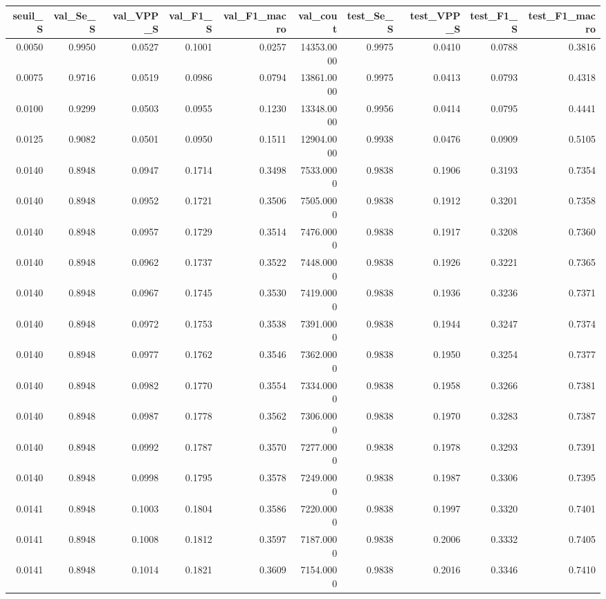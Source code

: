 \begin{tabular}{rrrrrrrrrr}
\toprule
seuil_S & val_Se_S & val_VPP_S & val_F1_S & val_F1_macro & val_cout & test_Se_S & test_VPP_S & test_F1_S & test_F1_macro \\
\midrule
0.0050 & 0.9950 & 0.0527 & 0.1001 & 0.0257 & 14353.0000 & 0.9975 & 0.0410 & 0.0788 & 0.3816 \\
0.0075 & 0.9716 & 0.0519 & 0.0986 & 0.0794 & 13861.0000 & 0.9975 & 0.0413 & 0.0793 & 0.4318 \\
0.0100 & 0.9299 & 0.0503 & 0.0955 & 0.1230 & 13348.0000 & 0.9956 & 0.0414 & 0.0795 & 0.4441 \\
0.0125 & 0.9082 & 0.0501 & 0.0950 & 0.1511 & 12904.0000 & 0.9938 & 0.0476 & 0.0909 & 0.5105 \\
0.0140 & 0.8948 & 0.0947 & 0.1714 & 0.3498 & 7533.0000 & 0.9838 & 0.1906 & 0.3193 & 0.7354 \\
0.0140 & 0.8948 & 0.0952 & 0.1721 & 0.3506 & 7505.0000 & 0.9838 & 0.1912 & 0.3201 & 0.7358 \\
0.0140 & 0.8948 & 0.0957 & 0.1729 & 0.3514 & 7476.0000 & 0.9838 & 0.1917 & 0.3208 & 0.7360 \\
0.0140 & 0.8948 & 0.0962 & 0.1737 & 0.3522 & 7448.0000 & 0.9838 & 0.1926 & 0.3221 & 0.7365 \\
0.0140 & 0.8948 & 0.0967 & 0.1745 & 0.3530 & 7419.0000 & 0.9838 & 0.1936 & 0.3236 & 0.7371 \\
0.0140 & 0.8948 & 0.0972 & 0.1753 & 0.3538 & 7391.0000 & 0.9838 & 0.1944 & 0.3247 & 0.7374 \\
0.0140 & 0.8948 & 0.0977 & 0.1762 & 0.3546 & 7362.0000 & 0.9838 & 0.1950 & 0.3254 & 0.7377 \\
0.0140 & 0.8948 & 0.0982 & 0.1770 & 0.3554 & 7334.0000 & 0.9838 & 0.1958 & 0.3266 & 0.7381 \\
0.0140 & 0.8948 & 0.0987 & 0.1778 & 0.3562 & 7306.0000 & 0.9838 & 0.1970 & 0.3283 & 0.7387 \\
0.0140 & 0.8948 & 0.0992 & 0.1787 & 0.3570 & 7277.0000 & 0.9838 & 0.1978 & 0.3293 & 0.7391 \\
0.0140 & 0.8948 & 0.0998 & 0.1795 & 0.3578 & 7249.0000 & 0.9838 & 0.1987 & 0.3306 & 0.7395 \\
0.0141 & 0.8948 & 0.1003 & 0.1804 & 0.3586 & 7220.0000 & 0.9838 & 0.1997 & 0.3320 & 0.7401 \\
0.0141 & 0.8948 & 0.1008 & 0.1812 & 0.3597 & 7187.0000 & 0.9838 & 0.2006 & 0.3332 & 0.7405 \\
0.0141 & 0.8948 & 0.1014 & 0.1821 & 0.3609 & 7154.0000 & 0.9838 & 0.2016 & 0.3346 & 0.7410 \\

\end{tabular}
